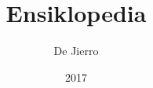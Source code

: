\documentclass[a5paper,11pt,twoside]{book}
\begin{document}
\title{Ensiklopedia}
\author{De Jierro}
\date{2017}

\maketitle




\end{document}
